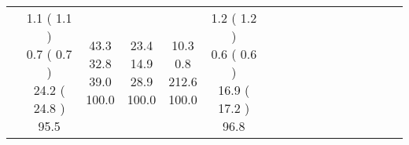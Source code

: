 \documentclass[9pt]{article}
\begin{document}
\begin{landscape}
\begin{longtable}{ l | c c c c | c c c c | c c c c | c c c c |}
 &
                    
                            \makecell{              1.1
     (             1.1
    ) \\
            {\footnotesize             0.7
     (              0.7
     )} \\
            {\footnotesize             24.2
     (            24.8
    ) } \\
            {\small  \textcolor[rgb]{ 0.29 , 0.611 , 0.1} {95.5  }
} }


             &
                            \makecell{              43.3
     \\
            {\footnotesize             32.8
    } \\  {\footnotesize             39.0
     } \\
            {\small \textcolor[rgb]{ 0.2 , 0.7 , 0.1} {100.0  }
} }
             &                         \makecell{              23.4
     \\
            {\footnotesize             14.9
    } \\  {\footnotesize             28.9
     } \\
            {\small \textcolor[rgb]{ 0.2 , 0.7 , 0.1} {100.0  }
} }
             &
                            \makecell{              10.3
     \\
            {\footnotesize             0.8
    } \\  {\footnotesize             212.6
     } \\
            {\small \textcolor[rgb]{ 0.2 , 0.7 , 0.1} {100.0  }
} }
            

 & 
                            \makecell{              1.2
     (             1.2
    ) \\
            {\footnotesize             0.6
     (              0.6
     )} \\
            {\footnotesize             16.9
     (            17.2
    ) } \\
            {\small  \textcolor[rgb]{ 0.264 , 0.636 , 0.1} {96.8  }
} }



\end{longtable}
\end{landscape}
\end{document}
